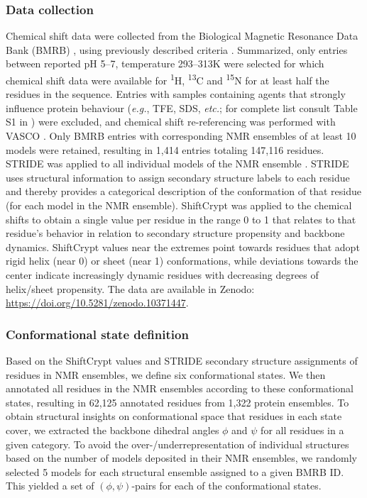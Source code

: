 \subsubsection{Data collection}
Chemical shift data were collected from the Biological Magnetic Resonance Data Bank (BMRB) \cite{hoch_biological_2023}, using previously described criteria \cite{cilia_protein_2013}. Summarized, only entries between reported pH 5--7, temperature 293--313K were selected for which chemical shift data were available for \textsuperscript{1}H, \textsuperscript{13}C and \textsuperscript{15}N for at least half the residues in the sequence. Entries with samples containing agents that strongly influence protein behaviour (\textit{e.g.}, TFE, SDS, \textit{etc.}; for complete list consult Table S1 in \cite{cilia_protein_2013}) were excluded, and chemical shift re-referencing was performed with VASCO \cite{rieping_validation_2010}. Only BMRB entries with corresponding NMR ensembles of at least 10 models were retained, resulting in 1,414 entries totaling 147,116 residues. STRIDE was applied to all individual models of the NMR ensemble  \cite{lovell_structure_2003,frishman_knowledge-based_1995}. STRIDE uses structural information to assign secondary structure labels to each residue and thereby provides a categorical description of the conformation of that residue (for each model in the NMR ensemble). ShiftCrypt \cite{orlando_auto-encoding_2019} was applied to the chemical shifts to obtain a single value per residue in the range 0 to 1 that relates to that residue's behavior in relation to secondary structure propensity and backbone dynamics. ShiftCrypt values near the extremes point towards residues that adopt rigid helix (near 0) or sheet (near 1) conformations, while deviations towards the center indicate increasingly dynamic residues with decreasing degrees of helix/sheet propensity. The data are available in Zenodo: \url{https://doi.org/10.5281/zenodo.10371447}.


\subsubsection{Conformational state definition}
Based on the ShiftCrypt values and STRIDE \cite{lovell_structure_2003,frishman_knowledge-based_1995} secondary structure assignments of residues in NMR ensembles, we define six conformational states. We then annotated all residues in the NMR ensembles according to these conformational states, resulting in 62,125 annotated residues from 1,322 protein ensembles. To obtain structural insights on conformational space that residues in each state cover, we extracted the backbone dihedral angles $\phi$ and $\psi$ for all residues in a given category. To avoid the over\nobreakdash-/underrepresentation of individual structures based on the number of models deposited in their NMR ensembles, we randomly selected 5 models for each structural ensemble assigned to a given BMRB ID. This yielded a set of $(\phi, \psi)$-pairs for each of the conformational states. 

